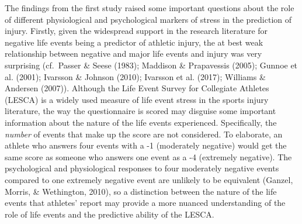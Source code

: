 \documentclass[
  english,
  man,floatsintext]{apa6}
\begin{document}
The findings from the first study raised some important questions about the role of different physiological and psychological markers of stress in the prediction of injury. Firstly, given the widespread support in the research literature for negative life events being a predictor of athletic injury, the at best weak relationship between negative and major life events and injury was very surprising (cf.~Passer \& Seese (1983); Maddison \& Prapavessis (2005); Gunnoe et al. (2001); Ivarsson \& Johnson (2010); Ivarsson et al. (2017); Williams \& Andersen (2007)).
Although the Life Event Survey for Collegiate Athletes (LESCA) is a widely used measure of life event stress in the sports injury literature, the way the questionnaire is scored may disguise some important information about the nature of the life events experienced.
Specifically, the \emph{number} of events that make up the score are not considered.
To elaborate, an athlete who answers four events with a -1 (moderately negative) would get the same score as someone who answers one event as a -4 (extremely negative).
The psychological and physiological responses to four moderately negative events compared to one extremely negative event are unlikely to be equivalent (Ganzel, Morris, \& Wethington, 2010), so a distinction between the nature of the life events that athletes' report may provide a more nuanced understanding of the role of life events and the predictive ability of the LESCA.
\end{document}
